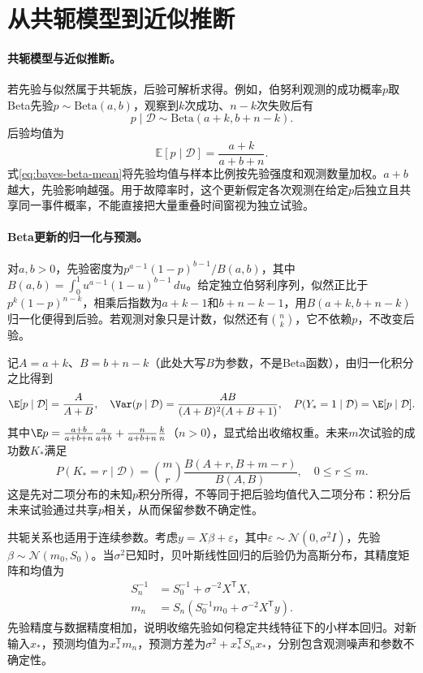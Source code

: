 \section{从共轭模型到近似推断}
\paragraph{共轭模型与近似推断。}
若先验与似然属于共轭族，后验可解析求得。例如，伯努利观测的成功概率$p$取Beta先验$p\sim\mathrm{Beta}(a,b)$，观察到$k$次成功、$n-k$次失败后有
\begin{equation}
 p\mid\mathcal{D}\sim\mathrm{Beta}(a+k,b+n-k).
\end{equation}
后验均值为
\begin{equation}
 \mathbb{E}[p\mid\mathcal D]=\frac{a+k}{a+b+n}.\label{eq:bayes-beta-mean}
\end{equation}
式\eqref{eq:bayes-beta-mean}将先验均值与样本比例按先验强度和观测数量加权。$a+b$越大，先验影响越强。用于故障率时，这个更新假定各次观测在给定$p$后独立且共享同一事件概率，不能直接把大量重叠时间窗视为独立试验。

\paragraph{Beta更新的归一化与预测。}
对$a,b>0$，先验密度为$p^{a-1}(1-p)^{b-1}/B(a,b)$，其中$B(a,b)=\int_0^1u^{a-1}(1-u)^{b-1}\,du$。给定独立伯努利序列，似然正比于$p^k(1-p)^{n-k}$，相乘后指数为$a+k-1$和$b+n-k-1$，用$B(a+k,b+n-k)$归一化便得到后验。若观测对象只是计数，似然还有$\binom nk$，它不依赖$p$，不改变后验。

记$A=a+k$、$B=b+n-k$（此处大写$B$为参数，不是Beta函数），由归一化积分之比得到
\begin{equation}
 \E[p\mid\mathcal D]=\frac{A}{A+B},\quad
 \Var(p\mid\mathcal D)=\frac{AB}{(A+B)^2(A+B+1)},\quad
 P(Y_*=1\mid\mathcal D)=\E[p\mid\mathcal D].
\end{equation}
其中$\E p=\frac{a+b}{a+b+n}\frac a{a+b}+\frac n{a+b+n}\frac kn$（$n>0$），显式给出收缩权重。未来$m$次试验的成功数$K_*$满足
\begin{equation}
 P(K_*=r\mid\mathcal D)=\binom mr
 \frac{B(A+r,B+m-r)}{B(A,B)},\quad 0\leq r\leq m.
\end{equation}
这是先对二项分布的未知$p$积分所得，不等同于把后验均值代入二项分布：积分后未来试验通过共享$p$相关，从而保留参数不确定性。

共轭关系也适用于连续参数。考虑$y=X\beta+\varepsilon$，其中$\varepsilon\sim\mathcal N(0,\sigma^2I)$，先验$\beta\sim\mathcal N(m_0,S_0)$。当$\sigma^2$已知时，贝叶斯线性回归的后验仍为高斯分布，其精度矩阵和均值为
\begin{align}
 S_n^{-1}&=S_0^{-1}+\sigma^{-2}X^{\mathsf T}X,\\
 m_n&=S_n\left(S_0^{-1}m_0+\sigma^{-2}X^{\mathsf T}y\right).
\end{align}
先验精度与数据精度相加，说明收缩先验如何稳定共线特征下的小样本回归。对新输入$x_*$，预测均值为$x_*^{\mathsf T}m_n$，预测方差为$\sigma^2+x_*^{\mathsf T}S_nx_*$，分别包含观测噪声和参数不确定性。

